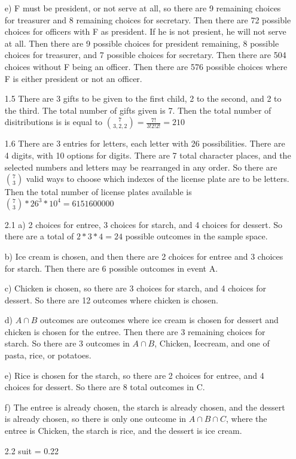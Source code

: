 \documentclass[11pt]{article}
\begin{document}
\begin{itemize}
	e) F must be president, or not serve at all, so there are 9 remaining choices for treasurer and 8 remaining choices for secretary. Then there are 72 possible choices for officers with F as president. If he is not presient, he will not serve at all. Then there are 9 possible choices for president remaining, 8 possible choices for treasurer, and 7 possible choices for secretary. Then there are 504 choices without F being an officer. Then there are 576 possible choices where F is either president or not an officer.
\item[1.5]
	There are 3 gifts to be given to the first child, 2 to the second, and 2 to the third. The total number of gifts given is 7. Then the total number of disitributions is is equal to $\binom{7}{3,2,2} = \frac{7!}{3!2!2!} = 210$
\item[1.6]
	There are 3 entries for letters, each letter with 26 possibilities. There are 4 digits, with 10 options for digits. There are 7 total character places, and the selected numbers and letters may be rearranged in any order. So there are $\binom{7}{3}$ valid ways to choose which indexes of the license plate are to be letters. Then the total number of license plates available is $\binom{7}{3} * 26^3 * 10^4 = 6151600000$ 
\item[2.1]
	a) 2 choices for entree, 3 choices for starch, and 4 choices for dessert. So there are a total of $2 * 3 * 4 = 24$ possible outcomes in the sample space.

	b) Ice cream is chosen, and then there are 2 choices for entree and 3 choices for starch. Then there are 6 possible outcomes in event A.

	c) Chicken is chosen, so there are 3 choices for starch, and 4 choices for dessert. So there are 12 outcomes where chicken is chosen.

	d) $A \cap B$ outcomes are outcomes where ice cream is chosen for dessert and chicken is chosen for the entree. Then there are 3 remaining choices for starch. So there are 3 outcomes in $A \cap B$, Chicken, Icecream, and one of pasta, rice, or potatoes.

	e) Rice is chosen for the starch, so there are 2 choices for entree, and 4 choices for dessert. So there are 8 total outcomes in C.

	f) The entree is already chosen, the starch is already chosen, and the dessert is already chosen, so there is only one outcome in $A \cap B \cap C$, where the entree is Chicken, the starch is rice, and the dessert is ice cream.
\item[2.2]
	suit 	= 0.22
	

\end{itemize}
\end{document}
